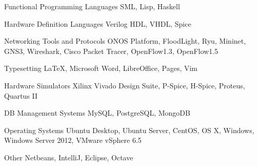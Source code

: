 \documentclass[]{friggeri-cv} %
\begin{document}
\begin{entrylist}

  \entry{\textcolor{TextGreen}{$\bullet$}}
  {Functional Programming Languages}
  {}
  {SML, Lisp, Haskell}


  \entry{\textcolor{TextOrange}{$\bullet$}}
  {Hardware Definition Languages}
  {}
  {Verilog HDL, VHDL, Spice}


  \entry{\textcolor{DarkBlue}{$\bullet$}}
  {Networking Tools and Protocols}
  {}
  {ONOS Platform, FloodLight, Ryu, Mininet, GNS3, Wireshark, Cisco Packet Tracer, OpenFlow1.3, OpenFlow1.5}


  \entry{\textcolor{Ocean}{$\bullet$}}
  {Typesetting}
  {}
  {\LaTeX, Microsoft Word, LibreOffice, Pages, Vim}


  \entry{\textcolor{LightGray}{$\bullet$}}
  {Hardware Simulators}
  {}
  {Xilinx Vivado Design Suite, P-Spice, H-Spice, Proteus, Quartus II}


  \entry{\textcolor{TextYellow}{$\bullet$}}
  {DB Management Systems}
  {}
  {MySQL, PostgreSQL, MongoDB}


  \entry{\textcolor{TextRed}{$\bullet$}}
  {Operating Systems}
  {}
  {Ubuntu Desktop, Ubuntu Server, CentOS, OS X, Windows, Windows Server 2012, VMware vSphere 6.5}


  \entry{\textcolor{TextPink}{$\bullet$}}
  {Other}
  {}
  {Netbeans, IntelliJ, Eclipse, Octave}



\end{entrylist}
\end{document}
